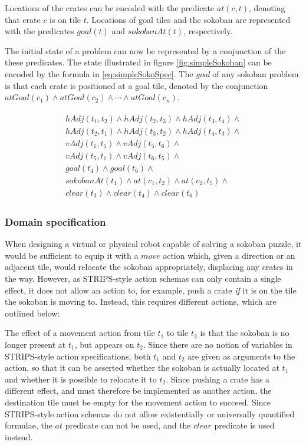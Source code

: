 \documentclass[../master.tex]{subfiles}
\begin{document}
Locations of the crates can be encoded with the predicate $at(c, t)$, denoting that crate $c$ is on tile $t$. Locations of goal tiles and the sokoban are represented with the predicates $goal(t)$ and $sokobanAt(t)$, respectively.

The initial state of a problem can now be represented by a conjunction of the these predicates. The state illustrated in figure \ref{fig:simpleSokoban} can be encoded by the formula in \eqref{eq:simpleSokoSpec}. The \textit{goal} of any sokoban problem is that each crate is positioned at a goal tile, denoted by the conjunction $atGoal(c_1) \land atGoal(c_2) \land \cdots \land atGoal(c_n)$.

\begin{gather}
\begin{gathered} \label{eq:simpleSokoSpec}
    hAdj(t_1, t_2) \land hAdj(t_2, t_3) \land hAdj(t_3, t_4) \land \\
    hAdj(t_2, t_1) \land hAdj(t_3, t_2) \land hAdj(t_4, t_3) \land \\
    vAdj(t_1, t_5) \land vAdj(t_5, t_6) \land \\
    vAdj(t_5, t_1) \land vAdj(t_6, t_5) \land \\
    goal(t_4) \land goal(t_6) \land \\
    sokobanAt(t_1) \land at(c_1, t_2) \land at(c_2, t_5) \land \\
    clear(t_3) \land clear(t_4) \land clear(t_6)
\end{gathered}
\end{gather}

\subsubsection*{Domain specification}
When designing a virtual or physical robot capable of solving a sokoban puzzle, it would be sufficient to equip it with a $move$ action which, given a direction or an adjacent tile, would relocate the sokoban appropriately, displacing any crates in the way. However, as STRIPS-style action schemas can only contain a single effect, it does not allow an action to, for example, push a crate \textit{if}  it is on the tile the sokoban is moving to. Instead, this requires different actions, which are outlined below:

The effect of a movement action from tile $t_1$ to tile $t_2$ is that the sokoban is no longer present at $t_1$, but appears on $t_2$. Since there are no notion of variables in STRIPS-style action specifications, both $t_1$ and $t_2$ are given as arguments to the action, so that it can be asserted whether the sokoban is actually located at $t_1$ and whether it is possible to relocate it to $t_2$. Since pushing a crate has a different effect, and must therefore be implemented as another action, the destination tile must be empty for the movement action to succeed. Since STRIPS-style action schemas do not allow existentially or universally quantified formulae, the $at$ predicate can not be used, and the $clear$ predicate is used instead.
\end{document}
